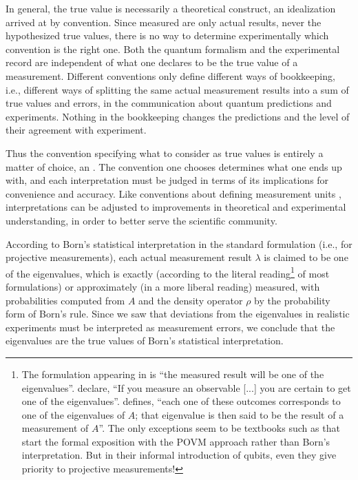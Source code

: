 \documentclass[12pt]{article}
\begin{document}
In general, the true value is necessarily a theoretical construct, an
idealization arrived at by convention.
Since measured are only actual results, never the hypothesized true
values, there is no way to determine experimentally which convention is
the right one. Both the quantum formalism and the experimental record
are independent of what one declares to be the true value of a
measurement. Different conventions only define different ways of
bookkeeping, i.e., different ways of splitting the same actual
measurement results into a sum of true values and errors, in the
communication about quantum predictions and experiments. Nothing in the
bookkeeping changes the predictions and the level of their agreement
with experiment.

Thus the convention specifying what to consider as true values is
entirely a matter of choice, an . The convention
one chooses determines what one ends up with, and each interpretation
must be judged in terms of its implications for convenience and
accuracy. Like conventions about defining measurement units
\cite{SIunits}, interpretations can be adjusted to improvements in
theoretical and experimental understanding, in order to better serve
the scientific community.


According to Born's statistical interpretation in the standard
formulation (i.e., for projective measurements),
each actual measurement result $\lambda$ is claimed to be one of the
eigenvalues, which is exactly (according to the literal
reading\footnote{\label{f.proj}
The formulation appearing in  \cite{Wik.Born} is
``the measured result will be one of the eigenvalues''.
 \cite[p.133]{GriS} declare, ``If you
measure an observable [...] you are certain to get one of the
eigenvalues''.  \cite[p.95]{Peres} defines, ``each one of
these outcomes corresponds to one of the eigenvalues of $A$; that
eigenvalue is then said to be the result of a measurement of $A$''.
The only exceptions seem to be textbooks such as
 \cite[p.84f]{NieC} that start the formal
exposition with the POVM approach rather than Born's interpretation.
But in their informal introduction of qubits, even they give priority 
to projective measurements!
} %
 of most formulations) or approximately (in a more liberal
reading) measured, with probabilities computed from $A$ and the density
operator $\rho$ by the probability form of Born's rule. Since we saw
that deviations from the eigenvalues in realistic experiments must
be interpreted as measurement errors, we conclude that the eigenvalues
are the true values of Born's statistical interpretation.
\end{document}
